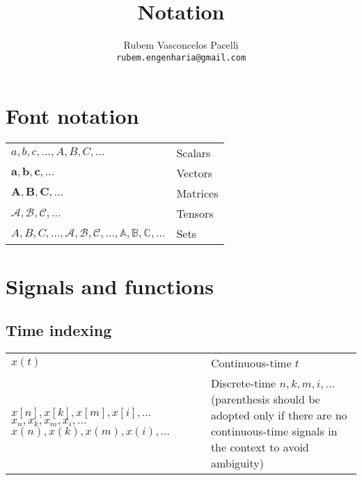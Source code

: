 \documentclass{article}
\begin{document}
\title{\textbf{Notation}  \vspace{-.3cm}}
\author{Rubem Vasconcelos Pacelli\\
  {\tt rubem.engenharia@gmail.com}}
\maketitle

\section{Font notation}
\begin{xltabular}{\textwidth}{XX}
  $a,b,c, \dots, A, B, C, \dots$ & Scalars \\
  $\mathbf{a}, \mathbf{b}, \mathbf{c}, \dots$ & Vectors \\
  $\mathbf{A}, \mathbf{B}, \mathbf{C}, \dots$ & Matrices \\
  $\bm{\mathcal{A}}, \bm{\mathcal{B}}, \bm{\mathcal{C}}, \dots$ & Tensors \\
  $A, B, C, \dots, \mathcal{A}, \mathcal{B}, \mathcal{C}, \dots, \mathbb{A}, \mathbb{B}, \mathbb{C}, \dots$ &  Sets\\
\end{xltabular}


\section{Signals and functions}
\subsection{Time indexing}
\begin{xltabular}{\textwidth}{p{5.7cm}X}
    \(x(t)\) & Continuous-time \(t\)\\
    \(x[n], x[k], x[m], x[i], \dots\) \(x_n, x_k, x_m, x_i, \dots\) \(x(n), x(k), x(m), x(i), \dots\) & Discrete-time \(n, k, m, i, \dots\) (parenthesis should be adopted only if there are no continuous-time signals in the context to avoid ambiguity)
\end{xltabular}
\end{document}
